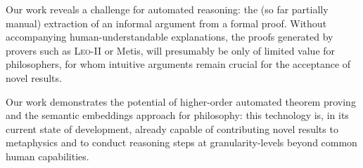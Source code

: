 \documentclass{llncs}
\newcommand{\logic}[1]{\textbf{#1}\xspace}
\newcommand{\SFive}{\logic{S5}}
\newcommand{\SFiveU}{\logic{S5\textsuperscript{U}}}
\begin{document}
Our work reveals a challenge for automated reasoning:
the (so far partially manual) extraction of an informal argument from a formal proof. 
Without accompanying human-understandable explanations,
the proofs generated by provers such as \textsc{Leo-II} or Metis, will
presumably be only of limited value for philosophers, for whom intuitive
arguments remain crucial for the acceptance of novel results.



Our work 
demonstrates
the potential of higher-order automated theorem proving and the
semantic embeddings approach for philosophy: this technology is,
in its current state of development, already capable of contributing novel results to
metaphysics and to conduct reasoning steps at granularity-levels
beyond common human capabilities.  
\vfill














\pagebreak
\end{document}
